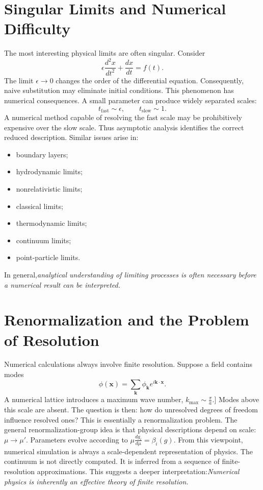 \section{Singular Limits and Numerical Difficulty}
The most interesting physical limits are often singular.
Consider
\[\epsilon\frac{d^2x}{dt^2}+\frac{dx}{dt}=f(t).\]
The limit $\epsilon\rightarrow 0$
changes the order of the differential equation.
Consequently, naive substitution may eliminate initial conditions.
This phenomenon has numerical consequences. A small parameter can produce 
widely separated scales:
\[t_{\mathrm{fast}}\sim\epsilon,\qquad t_{\mathrm{slow}}\sim 1.\]
A numerical method capable of resolving the fast scale may be prohibitively 
expensive over the slow scale.
Thus asymptotic analysis identifies the correct reduced description.
Similar issues arise in:
\begin{itemize}
\item boundary layers;
\item hydrodynamic limits;
\item nonrelativistic limits;
\item classical limits;
\item thermodynamic limits;
\item continuum limits;
\item point-particle limits.
\end{itemize}
In general,\emph{analytical understanding of limiting processes is often 
necessary before a numerical result can be interpreted.}

\section{ Renormalization and the Problem of Resolution}
Numerical calculations always involve finite resolution.
Suppose a field contains modes
\[\phi(\mathbf{x})=\sum_{\mathbf{k}}\phi_{\mathbf{k}}e^{i\mathbf{k}\cdot\mathbf{x}}.\]
A numerical lattice introduces a maximum wave number,
$k_{\max}\sim\frac{\pi}{a}$.]
Modes above this scale are absent.
The question is then: how do unresolved degrees of freedom influence resolved ones?
This is essentially a renormalization problem.
The general renormalization-group idea is that physical descriptions depend on scale:
$\mu\rightarrow\mu'$.
Parameters evolve according to
$\mu\frac{dg_i}{d\mu}=\beta_i(g)$.
From this viewpoint, numerical simulation is always a scale-dependent 
representation of physics. The continuum is not directly computed. It is 
inferred from a sequence of finite-resolution approximations.
This suggests a deeper interpretation:\emph{Numerical physics is 
inherently an effective theory of finite resolution.}

